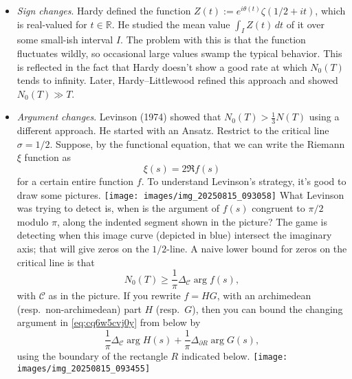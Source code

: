 \documentclass[reqno]{amsart} 
\begin{document}
\begin{itemize}
\item \emph{Sign changes}.  Hardy defined the function $Z(t) := e^{i \theta(t)} \zeta(1/2 + i t)$, which is real-valued for $t \in \mathbb{R}$.  He studied the mean value $\int_I Z(t) \, d t$ of it over some small-ish interval $I$.  The problem with this is that the function fluctuates wildly, so occasional large values swamp the typical behavior.  This is reflected in the fact that Hardy doesn't show a good rate at which $N_0(T)$ tends to infinity.  Later, Hardy--Littlewood refined this approach and showed $N_0(T) \gg T$.
\item \emph{Argument changes}.  Levinson (1974) showed that $N_0(T) > \frac{1}{3} N(T)$ using a different approach.  He started with an Ansatz.  Restrict to the critical line $\sigma = 1/2$.  Suppose, by the functional equation, that we can write the Riemann $\xi$ function as
  \begin{equation*}
    \xi(s) = 2 \Re f(s)
  \end{equation*}
  for a certain entire function $f$.  To understand Levinson's strategy, it's good to draw some pictures.
  \texttt{[image: images/img\_20250815\_093058]}
What Levinson was trying to detect is, when is the argument of $f(s)$ congruent to $\pi /2$ modulo $\pi$, along the indented segment shown in the picture?  The game is detecting when this image curve (depicted in blue) intersect the imaginary axis; that will give zeros on the $1/2$-line.  A naive lower bound for zeros on the critical line is that
\begin{equation}\label{eq:cq6w5cvj0y}
  N_0(T) \geq \frac{1}{\pi} \Delta_{\mathcal{C}} \arg f(s),
\end{equation}
with $\mathcal{C}$ as in the picture.  If you rewrite $f = H G$, with an archimedean (resp.\ non-archimedean) part $H$ (resp.\ $G$), then you can bound the changing argument in \eqref{eq:cq6w5cvj0y} from below by
\begin{equation*}
  \frac{1}{\pi} \Delta_{\mathcal{C}} \arg H(s) + \frac{1}{\pi} \Delta_{\partial R} \arg G(s),
\end{equation*}
using the boundary of the rectangle $R$ indicated below.
\texttt{[image: images/img\_20250815\_093455]}


\end{itemize}
\end{document}
